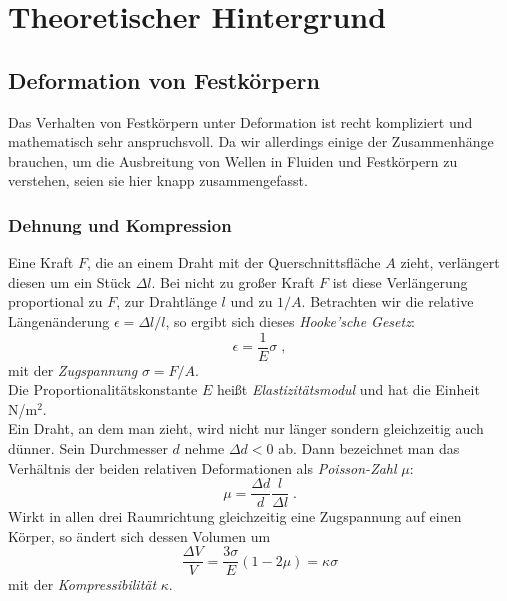 \section{Theoretischer Hintergrund}

\subsection{Deformation von Festkörpern}

Das Verhalten von Festkörpern unter Deformation ist recht kompliziert und mathematisch sehr anspruchsvoll. Da wir allerdings einige der Zusammenhänge brauchen, um die Ausbreitung von Wellen in Fluiden und Festkörpern zu verstehen, seien sie hier knapp zusammengefasst.

\subsubsection{Dehnung und Kompression}

Eine Kraft $F$, die an einem Draht mit der Querschnittsfläche $A$ zieht, verlängert diesen um ein Stück $\Delta l$. Bei nicht zu großer Kraft $F$ ist diese Verlängerung proportional zu $F$, zur Drahtlänge $l$ und zu $1/A$. Betrachten wir die relative Längenänderung $\epsilon = \Delta l/l$, so ergibt sich dieses \textit{Hooke'sche Gesetz}:
\begin{equation}
	\epsilon=\frac{1}{E}\sigma\; ,
\end{equation}
mit der \textit{Zugspannung} $\sigma=F/A$.\\
Die Proportionalitätskonstante $E$ heißt \textit{Elastizitätsmodul} und hat die Einheit N/m$^2$.\\
Ein Draht, an dem man zieht, wird nicht nur länger sondern gleichzeitig auch dünner. Sein Durchmesser $d$ nehme $\Delta d < 0$ ab. Dann bezeichnet man das Verhältnis der beiden relativen Deformationen als \textit{Poisson-Zahl} $\mu$:
\begin{equation}
	\mu = \frac{\Delta d}{d}\frac{l}{\Delta l}\; .
\end{equation}
Wirkt in allen drei Raumrichtung gleichzeitig eine Zugspannung auf einen Körper, so ändert sich dessen Volumen um
\begin{equation}
	\frac{\Delta V}{V} = \frac{3 \sigma}{E}\left( 1-2\mu\right) = \kappa\sigma
\end{equation}
mit der \textit{Kompressibilität} $\kappa$.

